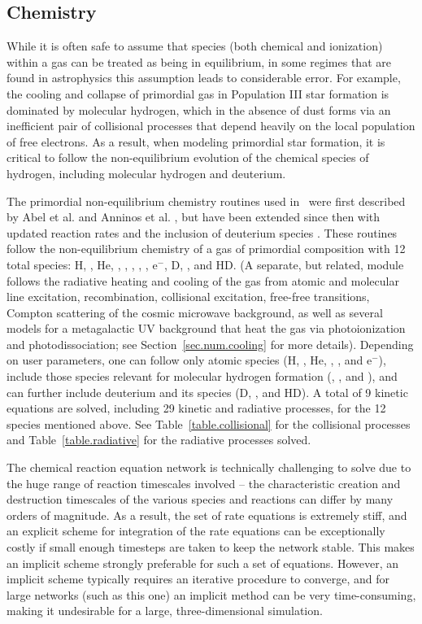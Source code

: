 \subsection{Chemistry}
\label{sec.num.chemistry}

While it is often safe to assume that species (both chemical and
ionization) within a gas can be treated as being in equilibrium, in
some regimes that are found in astrophysics this assumption leads to
considerable error.  For example, the cooling and collapse of
primordial gas in Population III star formation is dominated by
molecular hydrogen, which in the absence of dust forms via an
inefficient pair of collisional processes that depend heavily on the
local population of free electrons.  As a result, when modeling
primordial star formation, it is critical to follow the
non-equilibrium evolution of the chemical species of hydrogen,
including molecular hydrogen and deuterium.

The primordial non-equilibrium chemistry routines used in \enzo\ were
first described by Abel et al. and Anninos et
al. \citep{abel97,anninos97}, but have been extended since then with
updated reaction rates and the inclusion of deuterium species
\citep{2009PhDT.........5T}.  These routines follow the
non-equilibrium chemistry of a gas of primordial composition with 12
total species: H, \Hp, He, \Hep, \Hepp, \Hm, \HHp, \HH, e$^-$, D, \Dp,
and HD.  (A separate, but related, module follows the radiative
heating and cooling of the gas from atomic and molecular line
excitation, recombination, collisional excitation, free-free
transitions, Compton scattering of the cosmic microwave background, as
well as several models for a metagalactic UV background that heat the
gas via photoionization and photodissociation; see
Section~\ref{sec.num.cooling} for more details).  Depending on user
parameters, one can follow only atomic species (H, \Hp, He, \Hep,
\Hepp, and e$^-$), include those species relevant for molecular
hydrogen formation (\HH, \HHp, and \Hm), and can further include
deuterium and its species (D, \Dp, and HD).  A total of 9 kinetic
equations are solved, including 29 kinetic and radiative processes,
for the 12 species mentioned above.  See Table~\ref{table.collisional}
for the collisional processes and Table~\ref{table.radiative} for the
radiative processes solved.

The chemical reaction equation network is technically challenging to
solve due to the huge range of reaction timescales involved -- the
characteristic creation and destruction timescales of the various
species and reactions can differ by many orders of magnitude.  As a
result, the set of rate equations is extremely stiff, and an explicit
scheme for integration of the rate equations can be exceptionally
costly if small enough timesteps are taken to keep the network stable.
This makes an implicit scheme strongly preferable for such a set of
equations.  However, an implicit scheme typically requires an iterative
procedure to converge, and for large networks (such as this one) an
implicit method can be very time-consuming, making it undesirable for
a large, three-dimensional simulation.

